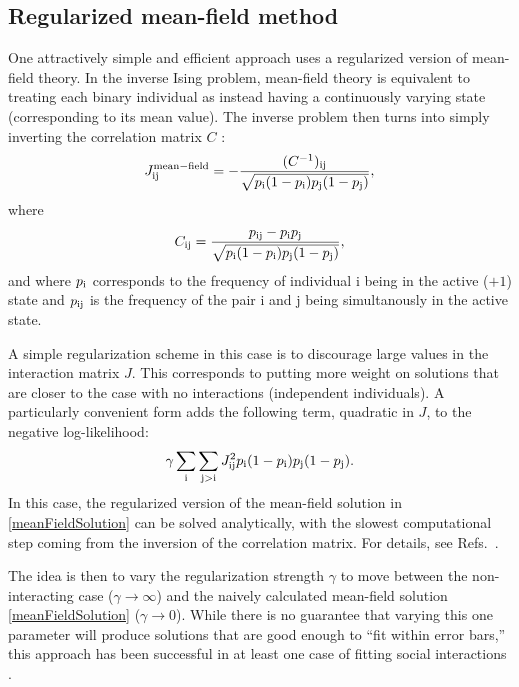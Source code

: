 \documentclass[aps,prl,twocolumn,nofootinbib]{revtex4-1}
\begin{document}
\subsection{Regularized mean-field method}
One attractively simple and efficient approach uses a regularized version of
mean-field theory.  In the inverse Ising problem, mean-field theory is equivalent
to treating each binary individual as instead having a continuously varying state
(corresponding to its mean value).  The inverse problem then turns into simply inverting
the correlation matrix $C$ \cite{CocMon12}:
\begin{equation}
\label{meanFieldSolution}
J^{\mathrm{mean-field}}_{\rm ij} =
    - \frac{ (C^{-1})_{\rm ij} }{ \sqrt{p_{\rm i}(1-p_{\rm i})p_{\rm j}(1-p_{\rm j})} },
\end{equation}
where
\begin{equation}
C_{\rm ij} = \frac{ p_{\rm ij} - p_{\rm i} p_{\rm j} }{ \sqrt{p_{\rm i}(1-p_{\rm i})p_{\rm j}(1-p_{\rm j})} },
\end{equation}
and where $p_{\rm i}$ corresponds to the frequency of individual i being
in the active ($+1$) state and $p_{\rm ij}$ is the frequency of the pair
i and j being simultanously in the active state.

A simple regularization scheme in this case is to discourage large values in the interaction
matrix $J$.  This corresponds to putting more weight on solutions that are closer to
the case with no interactions (independent individuals).  A particularly convenient form
adds the following term, quadratic in $J$, to the negative log-likelihood:
\begin{equation}
\gamma \sum_{\rm i} \sum_{\rm j > i} J_{\rm ij}^2 p_{\rm i} (1-p_{\rm i}) p_{\rm j} (1-p_{\rm j}).
\end{equation}
In this case, the regularized version of the mean-field solution in \eqref{meanFieldSolution}
can be solved analytically, with the slowest computational step coming from the inversion
of the correlation matrix.  For details, see Refs.~\cite{Daniels:2017cq,BarCoc13}.

The idea is then to vary the regularization strength $\gamma$ to move between the
non-interacting case ($\gamma \rightarrow \infty$) and the naively calculated
mean-field solution \eqref{meanFieldSolution} ($\gamma \rightarrow 0$).
While there is no guarantee that varying this one parameter will produce solutions that are
good enough to ``fit within error bars,'' this approach has been successful in at least
one case of fitting social interactions \cite{Daniels:2017cq}.
\end{document}
